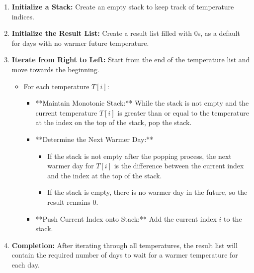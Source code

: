 \begin{enumerate}
    \item \textbf{Initialize a Stack:} Create an empty stack to keep track of temperature indices.
    
    \item \textbf{Initialize the Result List:} Create a result list filled with 0s, as a default for days with no warmer future temperature.
    
    \item \textbf{Iterate from Right to Left:} Start from the end of the temperature list and move towards the beginning.
        \begin{itemize}
            \item For each temperature \( T[i] \):
                \begin{itemize}
                    \item **Maintain Monotonic Stack:** While the stack is not empty and the current temperature \( T[i] \) is greater than or equal to the temperature at the index on the top of the stack, pop the stack.
                    
                    \item **Determine the Next Warmer Day:**
                        \begin{itemize}
                            \item If the stack is not empty after the popping process, the next warmer day for \( T[i] \) is the difference between the current index and the index at the top of the stack.
                            
                            \item If the stack is empty, there is no warmer day in the future, so the result remains 0.
                        \end{itemize}
                    
                    \item **Push Current Index onto Stack:** Add the current index \( i \) to the stack.
                \end{itemize}
        \end{itemize}
    
    \item \textbf{Completion:} After iterating through all temperatures, the result list will contain the required number of days to wait for a warmer temperature for each day.
\end{enumerate}

